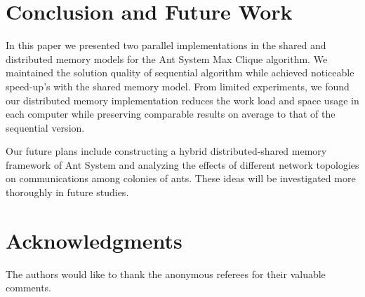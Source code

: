 \documentclass[11pt]{article}
\begin{document}
\section{Conclusion and Future Work}\label{conclusion}

In this paper we presented two parallel implementations in the shared and distributed memory models for the Ant System Max Clique algorithm.  We maintained the solution quality of sequential algorithm while achieved noticeable speed-up's with the shared memory model. From limited experiments, we found our distributed memory implementation reduces the work load and space usage in each computer while preserving comparable results on average to that of the sequential version.


Our future plans include constructing a hybrid distributed-shared memory framework of Ant System and analyzing the effects of different network topologies on communications among colonies of ants. These ideas will be investigated more thoroughly in future studies.  

\section{Acknowledgments}

The authors would like to thank the anonymous referees for their valuable comments.
\end{document}
